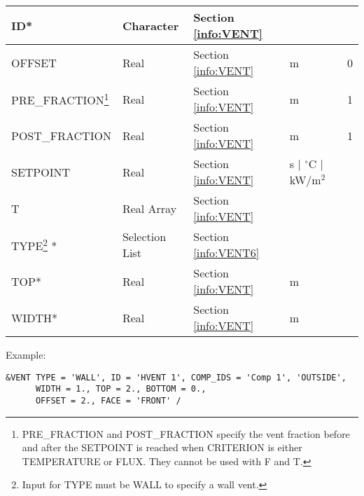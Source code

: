 \begin{minipage}{6.5in}
\begin{longtable}{@{\extracolsep{\fill}}|l|l|l|l|l|}
{\ct ID}*                                                         & Character  	          & Section \ref{info:VENT}      &                             &                 \\ \hline
{\ct OFFSET}       					 & Real 		  & Section \ref{info:VENT}      & m                           &      0        \\ \hline
{\ct PRE\_FRACTION}\footnote{{\ct PRE\_FRACTION} and {\ct POST\_FRACTION} specify the vent fraction before and after the {\ct SETPOINT} is reached when {\ct CRITERION} is either {\ct TEMPERATURE} or {\ct FLUX}. They cannot be used with {\ct F} and {\ct T}.}       					 & Real 		  & Section \ref{info:VENT}      & m                           &      1        \\ \hline
{\ct POST\_FRACTION}       					 & Real 		  & Section \ref{info:VENT}      & m                           &      1        \\ \hline
{\ct SETPOINT}           					 & Real  	          & Section \ref{info:VENT}      & s $\mid$ $^\circ$C $\mid$ kW/m$^2$ &                 \\ \hline
{\ct T}  					 & Real Array  		  & Section \ref{info:VENT}      &                             &                 \\ \hline
{\ct TYPE}\footnote{Input for {\ct TYPE} must be {\ct WALL} to specify a wall vent. } *
                                                                 & Selection List         & Section \ref{info:VENT6}     &                             &                 \\ \hline
{\ct TOP}*                 & Real                   & Section \ref{info:VENT}      & m                        &                 \\ \hline
{\ct WIDTH}*                                                      & Real                   & Section \ref{info:VENT}      & m                           &                 \\ \hline
\end{longtable}
\end{minipage}


\noindent Example:
\begin{lstlisting}
&VENT TYPE = 'WALL', ID = 'HVENT 1', COMP_IDS = 'Comp 1', 'OUTSIDE',
      WIDTH = 1., TOP = 2., BOTTOM = 0.,
      OFFSET = 2., FACE = 'FRONT' /

\end{lstlisting}

